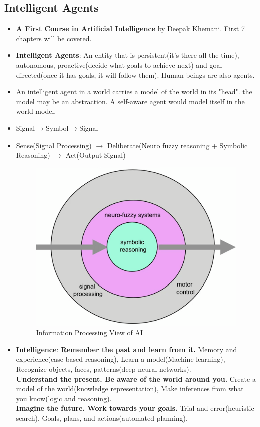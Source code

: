 \documentclass[a4paper]{article}
\begin{document}
\subsection{Intelligent Agents}
\begin{itemize}
    \item \textbf{A First Course in Artificial Intelligence} by Deepak Khemani. First 7 chapters will be covered.
    \item \textbf{Intelligent Agents}: An entity that is persistent(it's there all the time), autonomous, proactive(decide what goals to achieve next) and goal directed(once it has goals, it will follow them). Human beings are also agents.
    \item An intelligent agent in a world carries a model of the world in its "head". the model may be an abstraction. A self-aware agent would model itself in the world model.
    \item Signal$\rightarrow$Symbol$\rightarrow$Signal
    \item Sense(Signal Processing) $\rightarrow$ Deliberate(Neuro fuzzy reasoning + Symbolic Reasoning) $\rightarrow$ Act(Output Signal)
    \begin{figure}[H]
        \centering
        \includegraphics[width=0.5\linewidth]{Degree//static/AI_information_processing_view.png}
        \caption{Information Processing View of AI}
        \label{fig:AI-information-processing}
    \end{figure}
    \item \textbf{Intelligence}: \textbf{Remember the past and learn from it.} Memory and experience(case based reasoning), Learn a model(Machine learning), Recognize objects, faces, patterns(deep neural networks).\\
    \textbf{Understand the present. Be aware of the world around you.} Create a model of the world(knowledge representation), Make inferences from what you know(logic and reasoning).\\
    \textbf{Imagine the future. Work towards your goals.} Trial and error(heuristic search), Goals, plans, and actions(automated planning).
\end{itemize}
\end{document}
